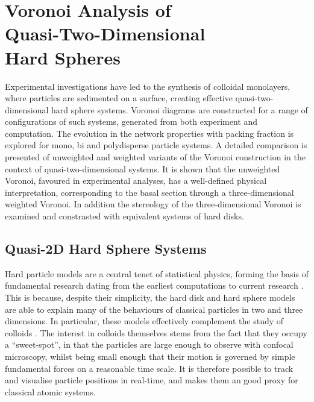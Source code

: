 \chapter[Voronoi Analysis of Quasi\--Two\--Dimensional Hard Spheres]{Voronoi Analysis of \\ Quasi\--Two\--Dimensional \\ Hard Spheres} 
\label{ch:quasi2d}

\begin{chapterabstract}
Experimental investigations have led to the synthesis of colloidal monolayers, where particles are sedimented on a surface, creating effective quasi\--two\--dimensional hard sphere systems.
Voronoi diagrams are constructed for a range of configurations of such systems, generated from both experiment and computation.
The evolution in the network properties with packing fraction is explored for mono, bi and polydisperse particle systems.
A detailed comparison is presented of unweighted and weighted variants of the Voronoi construction in the context of quasi\--two\--dimensional systems.
It is shown that the \td{} unweighted Voronoi, favoured in experimental analyses, has a well\--defined physical interpretation, corresponding to the basal section through a three\--dimensional weighted Voronoi.
In addition the stereology of the three\--dimensional Voronoi is examined and constrasted with equivalent systems of hard disks.
\end{chapterabstract}

\section{Quasi\--2D Hard Sphere Systems}

Hard particle models are a central tenet of statistical physics, forming the basis of fundamental research dating from the earliest computations to current research \cite{Isobe2016}.
This is because, despite their simplicity, the hard disk and hard sphere models are able to explain many of the behaviours of classical particles in two and three dimensions.
In particular, these models effectively complement the study of colloids \cite{Pusey1986}.
The interest in colloids themselves stems from the fact that they occupy a ``sweet\--spot'', in that the particles are large enough to observe with confocal microscopy, whilst being small enough that their motion is governed by simple fundamental forces on a reasonable time scale. 
It is therefore possible to track and visualise particle positions in real\--time, and makes them an good proxy for classical atomic systems.

